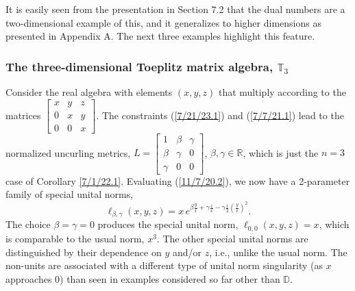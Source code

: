 \documentclass{amsart}
\theoremstyle{definition}
\numberwithin{theorem}{section}
\numberwithin{equation}{section}
\begin{document}
It is easily seen from the presentation in Section 7.2 that the dual numbers are a two-dimensional example of this, and it
generalizes to higher dimensions as presented in Appendix A.  The next three examples highlight this feature.  

\subsubsection{The three-dimensional Toeplitz matrix algebra, $\mathbb{T}_3$} Consider the real algebra with elements  $(x,y,z)$ that multiply according to the matrices $ \left[
\begin{array}{ccc}
x & y & z   \\
0 & x & y \\
0 & 0 & x  
\end{array}
\right]$.    The constraints (\ref{7/21/23.1}) and (\ref{7/7/21.1}) lead to the normalized uncurling metrics, $ L = \left[
\begin{array}{ccc}
1 & \beta & \gamma   \\
\beta & \gamma & 0 \\
\gamma & 0 & 0  
\end{array}
\right]$, $\beta,\gamma\in\mathbb{R}$, which is just the $n=3$ case of Corollary \ref{7/1/22.1}.    Evaluating (\ref{11/7/20.2}), we now have a 2-parameter family of special unital norms, \begin{equation}\label{3/31/21.3} \ell_{\beta,\gamma}(x,y,z) = x\, e^{ \beta\frac{y}{x}  +\gamma \frac{z}{x} -\gamma \frac{ 1}{2}\left(\frac{y}{x}\right)^2 }.\end{equation}    The choice $\beta = \gamma = 0$ produces the special unital norm, $\ell_{0,0}(x,y,z)= x$, which is comparable to the usual norm, $x^3$.  
 The other special unital norms are distinguished by their dependence on $y$ and/or $z$, i.e., unlike the usual norm.  The non-units are associated with a different type of unital norm singularity (as $x$ approaches 0) than seen in examples considered so far other than $\mathbb{D}$.
 
\end{document}

